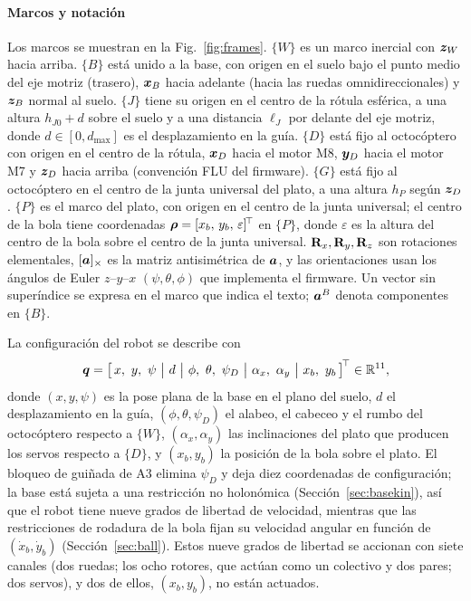\paragraph{Marcos y notación}
Los marcos se muestran en la Fig.~\ref{fig:frames}. $\{W\}$ es un marco inercial con $\bm{z}_W$ hacia arriba. $\{B\}$ está unido a la base, con origen en el suelo bajo el punto medio del eje motriz (trasero), $\bm{x}_B$ hacia adelante (hacia las ruedas omnidireccionales) y $\bm{z}_B$ normal al suelo. $\{J\}$ tiene su origen en el centro de la rótula esférica, a una altura $h_{J0}+d$ sobre el suelo y a una distancia $\ell_J$ por delante del eje motriz, donde $d\in[0,d_{\max}]$ es el desplazamiento en la guía. $\{D\}$ está fijo al octocóptero con origen en el centro de la rótula, $\bm{x}_D$ hacia el motor M8, $\bm{y}_D$ hacia el motor M7 y $\bm{z}_D$ hacia arriba (convención FLU del firmware). $\{G\}$ está fijo al octocóptero en el centro de la junta universal del plato, a una altura $h_P$ según $\bm{z}_D$. $\{P\}$ es el marco del plato, con origen en el centro de la junta universal; el centro de la bola tiene coordenadas $\bm{\rho}=[x_b,\,y_b,\,\varepsilon]^{\!\top}$ en $\{P\}$, donde $\varepsilon$ es la altura del centro de la bola sobre el centro de la junta universal. $\mathbf{R}_x,\mathbf{R}_y,\mathbf{R}_z$ son rotaciones elementales, $[\bm{a}]_\times$ es la matriz antisimétrica de $\bm{a}$, y las orientaciones usan los ángulos de Euler $z$--$y$--$x$ $(\psi,\theta,\phi)$ que implementa el firmware. Un vector sin superíndice se expresa en el marco que indica el texto; $\bm{a}^{B}$ denota componentes en $\{B\}$.

La configuración del robot se describe con
\begin{equation}
  \vect{q}=\big[\,x,\ y,\ \psi\ \big|\ d\ \big|\ \phi,\ \theta,\ \psi_D\ \big|\ \alpha_x,\ \alpha_y\ \big|\ x_b,\ y_b\,\big]\T\in\mathbb{R}^{11},
  \label{eq:q}
\end{equation}
donde $(x,y,\psi)$ es la pose plana de la base en el plano del suelo, $d$ el desplazamiento en la guía, $(\phi,\theta,\psi_D)$ el alabeo, el cabeceo y el rumbo del octocóptero respecto a $\{W\}$, $(\alpha_x,\alpha_y)$ las inclinaciones del plato que producen los servos respecto a $\{D\}$, y $(x_b,y_b)$ la posición de la bola sobre el plato. El bloqueo de guiñada de A3 elimina $\psi_D$ y deja diez coordenadas de configuración; la base está sujeta a una restricción no holonómica (Sección~\ref{sec:basekin}), así que el robot tiene nueve grados de libertad de velocidad, mientras que las restricciones de rodadura de la bola fijan su velocidad angular en función de $(\dot x_b,\dot y_b)$ (Sección~\ref{sec:ball}). Estos nueve grados de libertad se accionan con siete canales (dos ruedas; los ocho rotores, que actúan como un colectivo y dos pares; dos servos), y dos de ellos, $(x_b,y_b)$, no están actuados.

